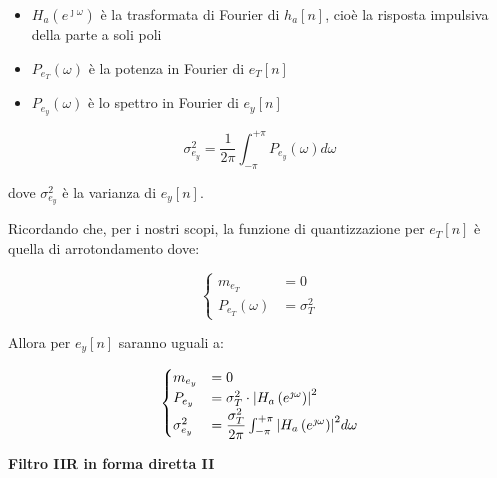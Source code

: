 \begin{itemize}
    \item $H_a \left(e^{\jmath \omega}\right)$ è la trasformata di Fourier di $h_a \left[ n\right]$, cioè la risposta impulsiva della parte a soli poli 
    \item $P_{e_T} \left(\omega\right)$ è la potenza in Fourier di $e_T \left[ n\right]$
    \item $P_{e_y} \left(\omega\right)$ è lo spettro in Fourier di $e_y \left[ n\right]$  
\end{itemize}

{
    \Large 
    \begin{equation}
        \sigma_{e_y}^{2} 
        = 
        \dfrac{1}{2 \pi} 
        \int_{- \pi}^{+ \pi}
        P_{e_y} \left(\omega\right) d\omega
    \end{equation}
}

dove $\sigma_{e_y}^{2}$ è la varianza di $e_y \left[ n\right]$. \newline 

Ricordando che, per i nostri scopi, la funzione di quantizzazione per $e_T \left[ n\right]$ è quella di arrotondamento dove: 

{
    \Large 
    \begin{equation}
        \begin{cases}
        m_{e_T} &= 0 
        \\
        P_{e_T} \left(\omega\right) &= \sigma_{T}^{2}   
        \end{cases}
    \end{equation}
}

Allora per $e_y \left[ n\right]$ saranno uguali a: 

{
    \Large 
    \begin{equation}
        \setlength{\jot}{20pt} %
        \begin{cases}
            m_{e_y} &= 0 
            \\
            P_{e_y} &= \sigma_{T}^{2} \cdot \abs{H_a \left(e^{\jmath \omega}\right)}^{2}
            \\
            \sigma_{e_y}^{2} &= \dfrac{\sigma_{T}^{2}}{2 \pi} \int_{- \pi}^{+ \pi} \abs{H_a \left(e^{\jmath \omega}\right)}^{2} d\omega
        \end{cases}
    \end{equation}
} 

\textbf{Filtro IIR in forma diretta II }\newline 

